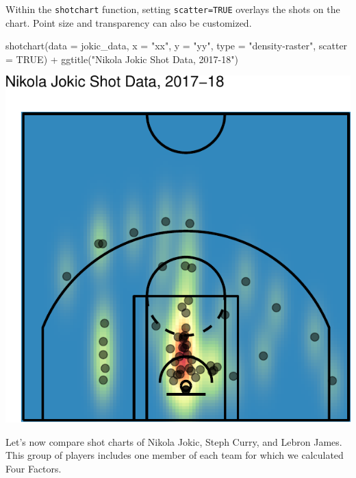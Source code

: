 \documentclass[
  11pt,
]{book}
\newenvironment{Shaded}{\begin{snugshade}}{\end{snugshade}}
\newcommand{\AttributeTok}[1]{\textcolor[rgb]{0.77,0.63,0.00}{#1}}
\newcommand{\ConstantTok}[1]{\textcolor[rgb]{0.00,0.00,0.00}{#1}}
\newcommand{\FunctionTok}[1]{\textcolor[rgb]{0.00,0.00,0.00}{#1}}
\newcommand{\NormalTok}[1]{#1}
\newcommand{\SpecialCharTok}[1]{\textcolor[rgb]{0.00,0.00,0.00}{#1}}
\newcommand{\StringTok}[1]{\textcolor[rgb]{0.31,0.60,0.02}{#1}}
\theoremstyle{definition}
\theoremstyle{definition}
\theoremstyle{definition}
\theoremstyle{definition}
\theoremstyle{remark}
\begin{document}
Within the \texttt{shotchart} function, setting \texttt{scatter=TRUE} overlays the shots on the chart. Point size and transparency can also be customized.

\begin{Shaded}
\begin{Highlighting}[]
\FunctionTok{shotchart}\NormalTok{(}\AttributeTok{data =}\NormalTok{ jokic\_data, }\AttributeTok{x =} \StringTok{"xx"}\NormalTok{, }\AttributeTok{y =} \StringTok{"yy"}\NormalTok{, }\AttributeTok{type =} \StringTok{"density{-}raster"}\NormalTok{, }\AttributeTok{scatter =} \ConstantTok{TRUE}\NormalTok{) }\SpecialCharTok{+}
    \FunctionTok{ggtitle}\NormalTok{(}\StringTok{"Nikola Jokic Shot Data, 2017{-}18"}\NormalTok{)}
\end{Highlighting}
\end{Shaded}

\includegraphics{series_files/figure-latex/basketballanalyzer 6-1.pdf}

Let's now compare shot charts of Nikola Jokic, Steph Curry, and Lebron James. This group of players includes one member of each team for which we calculated Four Factors.
\end{document}
